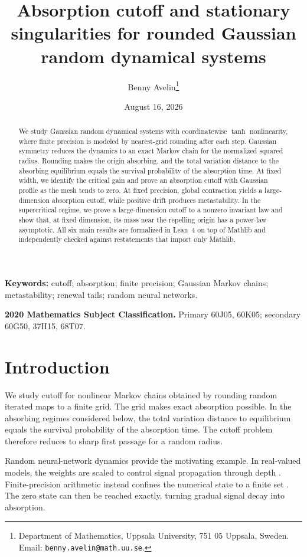 \documentclass[11pt,reqno,a4paper]{article}
\title{Absorption cutoff and stationary singularities for rounded Gaussian random dynamical systems}
\author{Benny Avelin\thanks{Department of Mathematics, Uppsala University,
751 05 Uppsala, Sweden. Email: \texttt{benny.avelin@math.uu.se}.}}
\date{August 16, 2026}
\begin{document}
\maketitle

\begin{abstract}
  We study Gaussian random dynamical systems with coordinatewise $\tanh$
  nonlinearity, where finite precision is modeled by nearest-grid rounding
  after each step. Gaussian symmetry reduces the
  dynamics to an exact Markov chain for the normalized squared radius.
  Rounding makes the
  origin absorbing, and the total variation distance to the absorbing
  equilibrium equals the survival probability of the absorption time. At
  fixed width, we identify the critical gain and prove an absorption cutoff
  with Gaussian profile as the mesh tends to zero. At fixed precision, global
  contraction yields a large-dimension absorption cutoff, while positive
  drift produces metastability. In the
  supercritical regime, we prove a large-dimension cutoff to a nonzero invariant
  law and show that, at fixed dimension, its mass near the repelling origin
  has a power-law asymptotic. All six main results are formalized in Lean~4 on
  top of Mathlib and independently checked against restatements that import
  only Mathlib.
\end{abstract}

\noindent\textbf{Keywords:}
cutoff; absorption; finite precision; Gaussian Markov chains; metastability;
renewal tails; random neural networks.

\smallskip

\noindent\textbf{2020 Mathematics Subject Classification.}
Primary 60J05, 60K05; secondary 60G50, 37H15, 68T07.

\tableofcontents

\section{Introduction}
\label{sec:introduction}

We study cutoff for nonlinear Markov chains obtained by rounding random
iterated maps to a finite grid. The grid makes exact absorption possible. In
the absorbing regimes considered below, the total variation distance to
equilibrium equals the survival probability of the absorption time. The
cutoff problem therefore reduces to sharp first passage for a random radius.

Random neural-network dynamics provide the motivating example. In real-valued
models, the weights are scaled to control signal propagation through depth
\cite{glorot-bengio2010,he-etal2015,poole-etal2016,schoenholz-etal2017}.
Finite-precision arithmetic instead confines the numerical state to a finite
set \cite{higham2002}. The zero state can then be reached exactly, turning
gradual signal decay into absorption.
\end{document}
